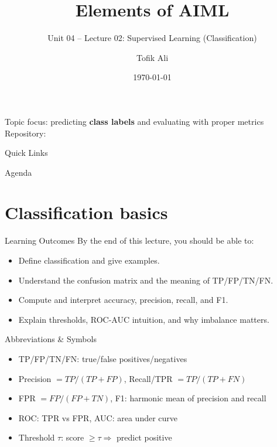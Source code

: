 \documentclass[aspectratio=169]{beamer}
\title[Elements of AIML]{Elements of AIML}
\subtitle{Unit 04 -- Lecture 02: Supervised Learning (Classification)}
\author{Tofik Ali}
\institute{School of Computer Science, UPES Dehradun}
\date{\today}
\begin{document}
\UPESCoverFrame
\setcounter{framenumber}{0}

\begin{frame}
  \titlepage
  \vspace{0.3em}
  \begin{center}
    \footnotesize Topic focus: predicting \textbf{class labels} and evaluating with proper metrics\\[0.25em]
    \footnotesize Repository: \texttt{\AIMLRepoURL}
  \end{center}
  \slidesources{\AIMLUnitIVSources}
\end{frame}

\begin{frame}{Quick Links}
  \centering
  \hyperlink{sec:cls}{}\hspace{0.6em}
  \hyperlink{sec:cm}{}\hspace{0.6em}
  \hyperlink{sec:metrics}{}\hspace{0.6em}
  \hyperlink{sec:imb}{}\hspace{0.6em}
  \hyperlink{sec:summary}{}
\end{frame}

\begin{frame}{Agenda}
  \tableofcontents
\end{frame}

\section{Classification basics}
\label{sec:cls}

\begin{frame}{Learning Outcomes}
  By the end of this lecture, you should be able to:
  \begin{itemize}[<+->]
    \item Define classification and give examples.
    \item Understand the confusion matrix and the meaning of TP/FP/TN/FN.
    \item Compute and interpret accuracy, precision, recall, and F1.
    \item Explain thresholds, ROC-AUC intuition, and why imbalance matters.
  \end{itemize}
\end{frame}

\begin{frame}{Abbreviations \& Symbols}
  \begin{itemize}[<+->]
    \item TP/FP/TN/FN: true/false positives/negatives
    \item Precision $=TP/(TP+FP)$,\; Recall/TPR $=TP/(TP+FN)$
    \item FPR $=FP/(FP+TN)$,\; F1: harmonic mean of precision and recall
    \item ROC: TPR vs FPR,\; AUC: area under curve
    \item Threshold $\tau$: score $\ge \tau \Rightarrow$ predict positive
  \end{itemize}
\end{frame}
\end{document}
